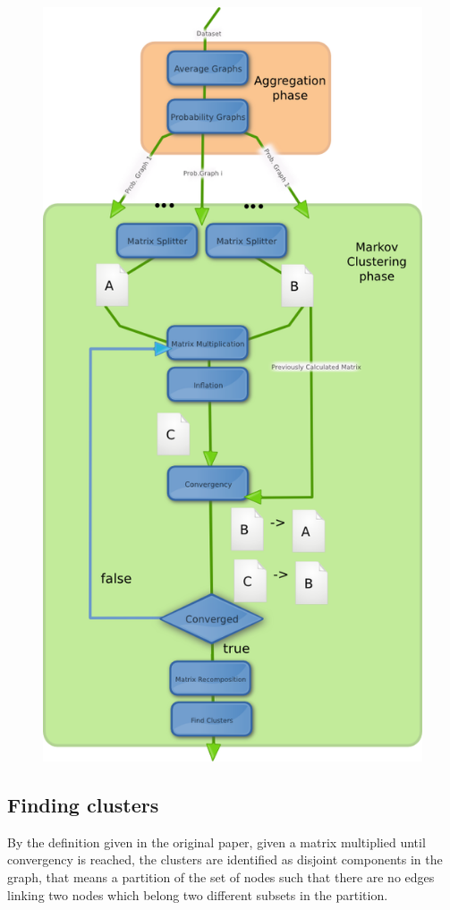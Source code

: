 \begin{figure}[H]
\centering
\includegraphics[scale=0.7]{completepipeline.png}
\label{fig:completepipeline}
\end{figure}
\newpage
\subsection{Finding clusters}
\label{findingcluster}
By the definition given in the original paper, given a matrix
multiplied until convergency is reached, the clusters are
identified as disjoint components in the graph, that means
a partition of the set of nodes such that there are no edges
linking two nodes which belong two different subsets in the partition.

